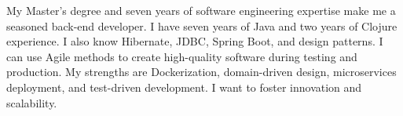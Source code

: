 \vspace*{-10pt}
\begin{referees}
\par{
    My Master's degree and seven years of software engineering expertise make me a seasoned back-end developer. I have seven years of Java and two years of Clojure experience. I also know Hibernate, JDBC, Spring Boot, and design patterns. I can use Agile methods to create high-quality software during testing and production. My strengths are Dockerization, domain-driven design, microservices deployment, and test-driven development. I want to foster innovation and scalability.}
\end{referees}	